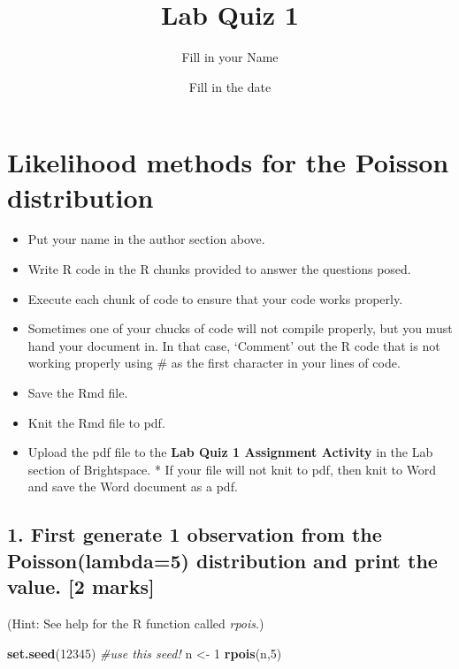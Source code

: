 \documentclass[
]{article}
\title{Lab Quiz 1}
\author{Fill in your Name}
\date{Fill in the date}
\newenvironment{Shaded}{\begin{snugshade}}{\end{snugshade}}
\newcommand{\CommentTok}[1]{\textcolor[rgb]{0.56,0.35,0.01}{\textit{#1}}}
\newcommand{\DecValTok}[1]{\textcolor[rgb]{0.00,0.00,0.81}{#1}}
\newcommand{\FunctionTok}[1]{\textcolor[rgb]{0.13,0.29,0.53}{\textbf{#1}}}
\newcommand{\NormalTok}[1]{#1}
\newcommand{\OtherTok}[1]{\textcolor[rgb]{0.56,0.35,0.01}{#1}}
\providecommand{\tightlist}{%
  \setlength{\itemsep}{0pt}\setlength{\parskip}{0pt}}
\begin{document}
\maketitle

\hypertarget{likelihood-methods-for-the-poisson-distribution}{%
\section{Likelihood methods for the Poisson
distribution}\label{likelihood-methods-for-the-poisson-distribution}}

\begin{itemize}
\tightlist
\item
  Put your name in the author section above.
\item
  Write R code in the R chunks provided to answer the questions posed.
\item
  Execute each chunk of code to ensure that your code works properly.
\item
  Sometimes one of your chucks of code will not compile properly, but
  you must hand your document in. In that case, `Comment' out the R code
  that is not working properly using \# as the first character in your
  lines of code.
\item
  Save the Rmd file.
\item
  Knit the Rmd file to pdf.
\item
  Upload the pdf file to the \textbf{Lab Quiz 1 Assignment Activity} in
  the Lab section of Brightspace. * If your file will not knit to pdf,
  then knit to Word and save the Word document as a pdf.
\end{itemize}

\hypertarget{first-generate-1-observation-from-the-poissonlambda5-distribution-and-print-the-value.-2-marks}{%
\subsection{1. First generate 1 observation from the Poisson(lambda=5)
distribution and print the value. {[}2
marks{]}}\label{first-generate-1-observation-from-the-poissonlambda5-distribution-and-print-the-value.-2-marks}}

(Hint: See help for the R function called \emph{rpois}.)

\begin{Shaded}
\begin{Highlighting}[]
\FunctionTok{set.seed}\NormalTok{(}\DecValTok{12345}\NormalTok{)   }\CommentTok{\#use this seed!}
\NormalTok{n }\OtherTok{\textless{}{-}} \DecValTok{1} 
\FunctionTok{rpois}\NormalTok{(n,}\DecValTok{5}\NormalTok{)}
\end{Highlighting}
\end{Shaded}
\end{document}
